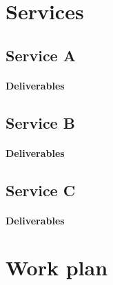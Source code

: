 \section{Services} \label{sec:services}

\lipsum[2]

\subsection{Service A} \label{sec:services:a}

\lipsum[2]

\paragraph{Deliverables} \lipsum[3]

\subsection{Service B} \label{sec:services:b}

\lipsum[2]

\paragraph{Deliverables} \lipsum[3]

\subsection{Service C} \label{sec:services:c}

\lipsum[2]

\paragraph{Deliverables} \lipsum[3]


\section{Work plan} \label{sec:plan}

\lipsum[2]